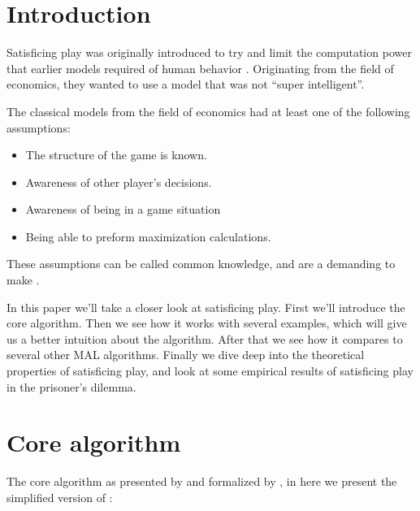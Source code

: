 \cleared {}

\section{Introduction}
\label{sec:introduction}
\cleared
Satisficing play was originally introduced
to try and limit the computation power that earlier models required of human
behavior \citep{herbert}. Originating from the field of economics, they
wanted to use a model that was not ``super intelligent''.

The classical models from the field of economics had at least one of the
following assumptions:
\begin{itemize}
\itemsep0em 
  \item The structure of the game is known.
  \item Awareness of other player's decisions.
  \item Awareness of being in a game situation
  \item Being able to preform maximization calculations.
\end{itemize}

These assumptions can be called common knowledge, and are a demanding to
make \citep{binmore}. 

In this paper we'll take a closer look at satisficing play. First we'll introduce
the core algorithm. Then we see how it works with several examples, which will
give us a better intuition about the algorithm. After that we see how it
compares to several other MAL algorithms. Finally we dive deep into the
theoretical properties of satisficing play, and look at some empirical results
of satisficing play in the prisoner's dilemma.

\section{Core algorithm}
\label{sec:core-algorithm}
\cleared The core algorithm as presented by \citep{herbert} and formalized by
\citep{karandikar},
in here we present the simplified version of \citep{stimpson:2001}:

